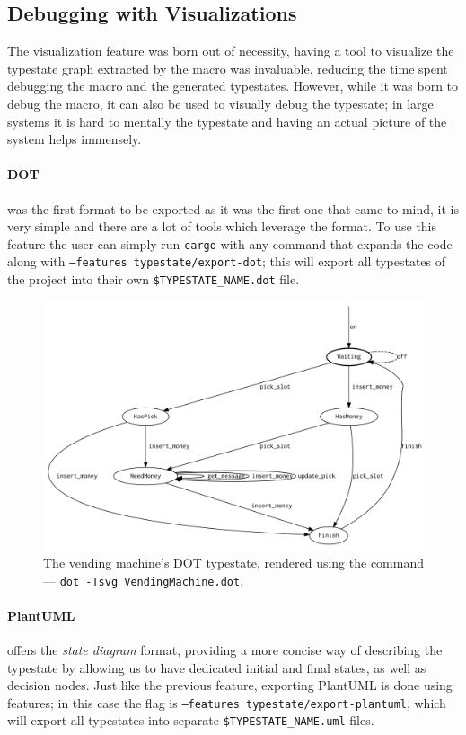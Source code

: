 \subsection{Debugging with Visualizations}

The visualization feature was born out of necessity,
having a tool to visualize the typestate graph extracted by the macro was invaluable,
reducing the time spent debugging the macro and the generated typestates.
However, while it was born to debug the macro, it can also be used to visually debug the typestate;
in large systems it is hard to mentally  the typestate and having an actual picture of the system helps immensely.

\paragraph{DOT} was the first format to be exported as it was the first one that came to mind,
it is very simple and there are a lot of tools which leverage the format.
To use this feature the user can simply run \texttt{cargo} with any command that expands the code along with \texttt{--features typestate/export-dot};
this will export all typestates of the project into their own \texttt{\$TYPESTATE\_NAME.dot} file.

\begin{figure}
    \centering
    \includegraphics[width=\linewidth]{Chapters/Figures/C4/VendingMachine.dot.pdf}
    \caption{The vending machine's DOT typestate, rendered using the command --- \texttt{dot -Tsvg VendingMachine.dot}.}
    \label{fig:vending-machine-typestate-dot}
\end{figure}

\paragraph{PlantUML} offers the \emph{state diagram} format, providing a more concise way of describing the typestate
by allowing us to have dedicated initial and final states, as well as decision nodes.
Just like the previous feature, exporting PlantUML is done using features;
in this case the flag is \texttt{--features typestate/export-plantuml},
which will export all typestates into separate \texttt{\$TYPESTATE\_NAME.uml} files.


